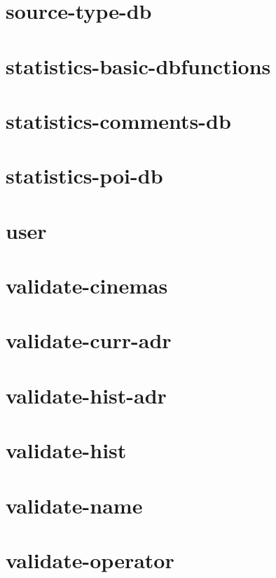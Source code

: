 \section{source-type-db}

\newpage
\section{statistics-basic-dbfunctions}

\newpage
\section{statistics-comments-db}

\newpage
\section{statistics-poi-db}

\newpage
\section{user}

\newpage
\section{validate-cinemas}

\newpage
\section{validate-curr-adr}

\newpage
\section{validate-hist-adr}

\newpage
\section{validate-hist}

\newpage
\section{validate-name}

\newpage
\section{validate-operator}

\newpage
